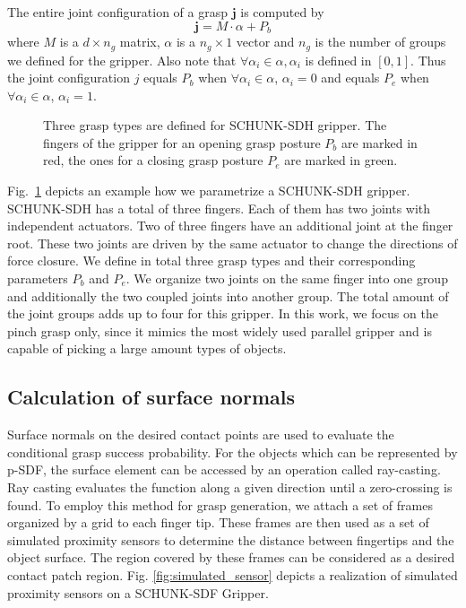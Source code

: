 The entire joint configuration of a grasp $\bm{j}$ is computed by 
\begin{equation}
\bm{j} = M \cdot \alpha + P_b
\label{equ:eigen_grasp}
\end{equation}
where $M$ is a $d \times n_g$ matrix, $\alpha$ is a $n_g \times 1$ vector and $n_g$ is the number of groups we defined for the gripper. Also note that $\forall \alpha_i \in \alpha, \alpha_i$ is defined in $[0,1]$. Thus the joint configuration $j$ equals $P_b$ when $\forall \alpha_i \in \alpha$, $\alpha_i = 0$ and equals $P_e$ when $\forall \alpha_i \in \alpha$, $\alpha_i = 1$. 

\begin{figure}[!htbp]
\centering
\def\svgwidth{1\linewidth}

\caption{Three grasp types are defined for SCHUNK-SDH gripper. The fingers of the gripper for an opening grasp posture $P_b$ are marked in red, the ones for a closing grasp posture $P_e$ are marked in green.}
\label{fig:grasp_types}
\end{figure}	

Fig.~\ref{fig:grasp_types} depicts an example how we parametrize a SCHUNK-SDH gripper. SCHUNK-SDH has a total of three fingers. Each of them has two joints with independent actuators. Two of three fingers have an additional joint at the finger root. These two joints are driven by the same actuator to change the directions of force closure. We define in total three grasp types and their corresponding parameters $P_b$ and $P_e$. We organize two joints on the same finger into one group and additionally the two coupled joints into another group. The total amount of the joint groups adds up to four for this gripper. In this work, we focus on the pinch grasp only, since it mimics the most widely used parallel gripper and is capable of picking a large amount types of objects.  

\subsection{Calculation of surface normals}
Surface normals on the desired contact points are used to evaluate the conditional grasp success probability. For the objects which can be represented by p-SDF, the surface element can be accessed by an operation called ray-casting. Ray casting evaluates the function along a given direction until a zero-crossing is found. To employ this method for grasp generation, we attach a set of frames organized by a grid to each finger tip. These frames are then used as a set of simulated proximity sensors to determine the distance between fingertips and the object surface. The region covered by these frames can be considered as a desired contact patch region. Fig. \ref{fig:simulated_sensor} depicts a realization of simulated proximity sensors on a SCHUNK-SDF Gripper.

